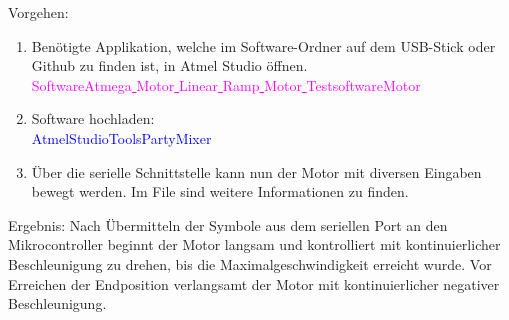Vorgehen:
\begin{enumerate}
\item Benötigte Applikation, welche im Software-Ordner auf dem USB-Stick oder Github \cite{aebi_projekt-6softwareatmega_2020} zu finden ist, in Atmel Studio öffnen.\\
\textcolor{magenta}{Software\textrightarrow Atmega\underline{ }Motor\underline{ }Linear\underline{ }Ramp\underline{ }Motor\underline{ }Testsoftware\textrightarrow Motor}\\

\item Software hochladen:\\
\textcolor{blue}{AtmelStudio\textrightarrow Tools\textrightarrow PartyMixer}\\

\item Über die serielle Schnittstelle kann nun der Motor mit diversen Eingaben bewegt werden. Im File sind weitere Informationen zu finden.

\end{enumerate}

Ergebnis: Nach Übermitteln der Symbole aus dem seriellen Port an den Mikrocontroller beginnt der Motor langsam und kontrolliert mit kontinuierlicher Beschleunigung zu drehen, bis die Maximalgeschwindigkeit erreicht wurde. Vor Erreichen der Endposition verlangsamt der Motor mit kontinuierlicher negativer Beschleunigung.
